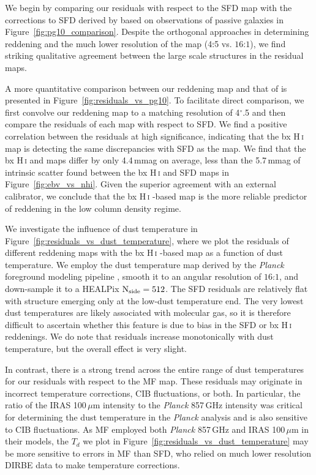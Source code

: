 \documentclass[iop,apj]{emulateapj}
\makeatletter
\def\testbx{bx}%
\DeclareRobustCommand{\ion}[2]{%
\relax\ifmmode
\ifx\testbx\f@series
{\mathbf{#1\,\mathsc{#2}}}\else
{\mathrm{#1\,\mathsc{#2}}}\fi
\else\textup{#1\,{\mdseries\textsc{#2}}}%
\fi}
\makeatother
\begin{document}
We begin by comparing our residuals with respect to the SFD map with the corrections to SFD derived by \citet{Peek+Graves_2010} based on observations of passive galaxies in Figure~\ref{fig:pg10_comparison}. Despite the orthogonal approaches in determining reddening and the much lower resolution of the \citet{Peek+Graves_2010} map (4$\overset{\circ}{.}$5 vs. $16\overset{'}{.}1$), we find striking qualitative agreement between the large scale structures in the residual maps.

A more quantitative comparison between our reddening map and that of \citet{Peek+Graves_2010} is presented in Figure~\ref{fig:residuals_vs_pg10}. To facilitate direct comparison, we first convolve our reddening map to a matching resolution of 4$^\circ$.5 and then compare the residuals of each map with respect to SFD. We find a positive correlation between the residuals at high significance, indicating that the \ion{H}{i} map is detecting the same discrepancies with SFD as the \citet{Peek+Graves_2010} map. We find that the \ion{H}{i} and \citet{Peek+Graves_2010} maps differ by only 4.4\,mmag on average, less than the 5.7\,mmag of intrinsic scatter found between the \ion{H}{i} and SFD maps in Figure~\ref{fig:ebv_vs_nhi}. Given the superior agreement with an external calibrator, we conclude that the \ion{H}{i}-based map is the more reliable predictor of reddening in the low column density regime.

We investigate the influence of dust temperature in Figure~\ref{fig:residuals_vs_dust_temperature}, where we plot the residuals of different reddening maps with the \ion{H}{i}-based map as a function of dust temperature. We employ the dust temperature map derived by the \textit{Planck} foreground modeling pipeline \citep{Planck_2013_XI}, smooth it to an angular resolution of $16\overset{'}{.}1$, and down-sample it to a HEALPix $\rm N_{side} = 512$. The SFD residuals are relatively flat with structure emerging only at the low-dust temperature end. The very lowest dust temperatures are likely associated with molecular gas, so it is therefore difficult to ascertain whether this feature is due to bias in the SFD or \ion{H}{i} reddenings. We do note that residuals increase monotonically with dust temperature, but the overall effect is very slight. 

In contrast, there is a strong trend across the entire range of dust temperatures for our residuals with respect to the MF map. These residuals may originate in incorrect temperature corrections, CIB fluctuations, or both. In particular, the ratio of the IRAS 100\,$\mu$m intensity to the {\it Planck} 857\,GHz intensity was critical for determining the dust temperature in the \textit{Planck} analysis and is also sensitive to CIB fluctuations. As MF employed both {\it Planck} 857\,GHz and IRAS 100\,$\mu$m in their models, the $T_d$ we plot in Figure~\ref{fig:residuals_vs_dust_temperature} may be more sensitive to errors in MF than SFD, who relied on much lower resolution DIRBE data to make temperature corrections.
\end{document}
